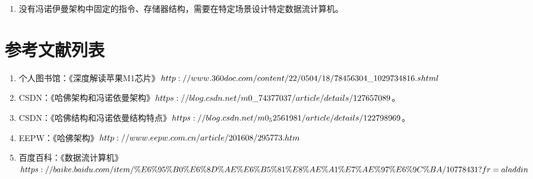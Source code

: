 \documentclass[UTF8]{ctexart}
\begin{document}
\begin{enumerate}
    \item 没有冯诺伊曼架构中固定的指令、存储器结构，需要在特定场景设计特定数据流计算机。
\end{enumerate}

\section{参考文献列表}

\begin{enumerate}
    \item 个人图书馆：《深度解读苹果M1芯片》$\\http://www.360doc.com/content/22/0504/18/78456304\_1029734816.shtml$
    \item CSDN：《哈佛架构和冯诺依曼架构》$\\https://blog.csdn.net/m0\_74377037/article/details/127657089$。
    \item CSDN：《哈佛结构和冯诺依曼结构特点》$\\https://blog.csdn.net/m0_52561981/article/details/122798969$。
    \item EEPW：《哈佛架构》$\\http://www.eepw.com.cn/article/201608/295773.htm$
    \item 百度百科：《数据流计算机》$\\https://baike.baidu.com/item/\%E6\%95\%B0\%E6\%8D\%AE\%E6\\\%B5\%81\%E8\%AE\%A1\%E7\%AE\%97\%E6\%9C\%BA/10778431?fr=aladdin$
\end{enumerate}
\end{document}

